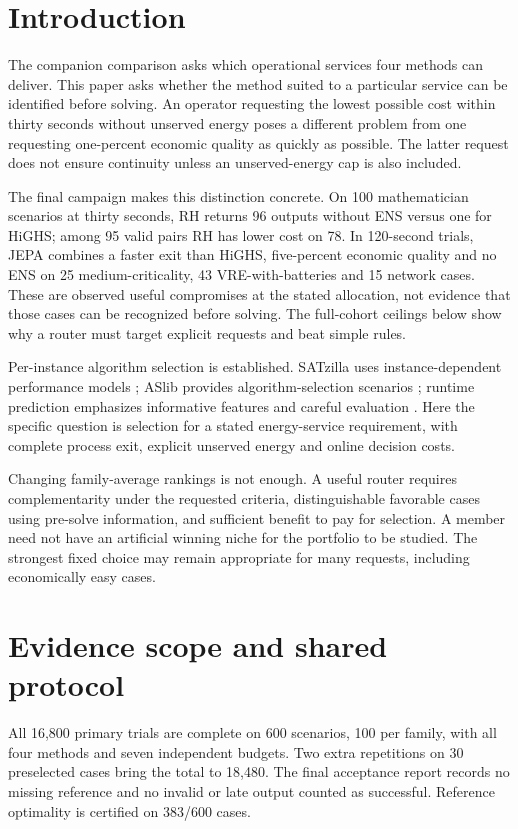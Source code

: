 \section{Introduction}
The companion comparison asks which operational services four methods can
deliver. This paper asks whether the method suited to a particular service
can be identified before solving. An operator requesting the lowest possible
cost within thirty seconds without unserved energy poses a different problem
from one requesting one-percent economic quality as quickly as possible.
The latter request does not ensure continuity unless an unserved-energy cap
is also included.

The final campaign makes this distinction concrete. On 100 mathematician
scenarios at thirty seconds, RH returns 96 outputs without ENS versus one
for HiGHS; among 95 valid pairs RH has lower cost on 78. In 120-second trials,
JEPA combines a faster exit than HiGHS, five-percent economic quality and no
ENS on 25 medium-criticality, 43 VRE-with-batteries and 15 network cases.
These are observed useful compromises at the stated allocation, not evidence
that those cases can be recognized before solving. The full-cohort ceilings
below show why a router must target explicit requests and beat simple rules.

Per-instance algorithm selection is established. SATzilla uses
instance-dependent performance models \citep{xu2008}; ASlib provides
algorithm-selection scenarios \citep{bischl2016}; runtime prediction emphasizes
informative features and careful evaluation \citep{hutter2013}. Here the
specific question is selection for a stated energy-service requirement, with
complete process exit, explicit unserved energy and online decision costs.

Changing family-average rankings is not enough. A useful router requires
complementarity under the requested criteria, distinguishable favorable cases
using pre-solve information, and sufficient benefit to pay for selection.
A member need not have an artificial winning niche for the portfolio to be
studied. The strongest fixed choice may remain appropriate for many requests,
including economically easy cases.

\section{Evidence scope and shared protocol}
All 16,800 primary trials are complete on 600 scenarios, 100 per family,
with all four methods and seven independent budgets. Two extra repetitions
on 30 preselected cases bring the total to 18,480. The final acceptance
report records no missing reference and no invalid or late output counted
as successful. Reference optimality is certified on 383/600 cases.

